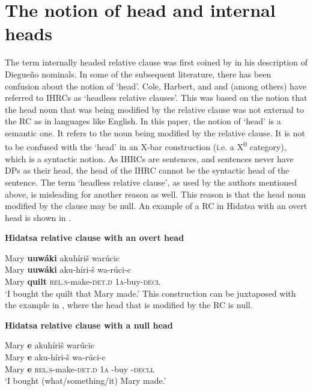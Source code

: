 \documentclass[output=paper]{LSP/langsci}
\begin{document}
\section{The notion of head and internal heads}

The term internally headed relative clause was first coined by \citet{Gorbet1976} in his description of Diegue\~no nominals.  In some of the subsequent literature, there has been confusion about the notion of `head'.  Cole, Harbert, and \citet{Hermon1982} and \citet{Weber1983} (among others) have referred to IHRCs as `headless relative clauses'. This was based on the notion that the head noun that was being modified by the relative clause was not external to the RC as in languages like English. In this paper, the notion of `head' is a semantic one. It refers to the noun being modified by the relative clause. It is not to be confused with the `head' in an X-bar construction (i.e. a X\textsuperscript{0} category), which is a syntactic notion. As IHRCs are sentences, and sentences never have DPs as their head, the head of the IHRC cannot be the syntactic head of the sentence.  The term `headless relative clause', as used by the authors mentioned above, is misleading for another reason as well.  This reason is that the head noun modified by the clause may be null.  An example of a RC in Hidatsa with an overt head is shown in .

\ea \textbf{Hidatsa relative clause with an overt head} \label{boyle9}

\glll Mary \textbf{uuw\'aki} akuh\'iri\v{s} war\'ucic\\
Mary \textbf{uuw\'aki} aku-h\'iri-\v{s}      wa-r\'uci-c\\
Mary \textbf{quilt} \textsc{rel.s}-make-\textsc{det.d} \textsc{1a}-buy-\textsc{decl} \\
\trans `I bought the quilt that Mary made.' 	
\z
This construction can be juxtaposed with the example in , where the head that is modified by the RC is null.

\ea \textbf{Hidatsa relative clause with a null head} \label{boyle10}

\glll Mary \textbf{e} akuh\'iri\v{s} war\'ucic\\
Mary \textbf{e} aku-h\'iri-\v{s}   wa-r\'uci-c\\
Mary \textbf{e} \textsc{rel.s}-make-\textsc{det.d} \textsc{1a} -buy -\textsc{decll}\\ 
\trans `I bought (what/something/it) Mary made.'
\z
\end{document}
